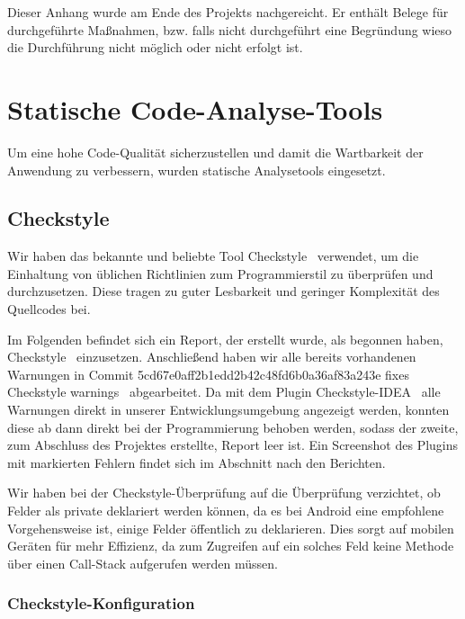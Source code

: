 
    Dieser Anhang wurde am Ende des Projekts nachgereicht. Er enthält Belege für
    durchgeführte Maßnahmen, bzw. falls nicht durchgeführt eine Begründung wieso
    die Durchführung nicht möglich oder nicht erfolgt ist. \\



\section{Statische Code-Analyse-Tools}

Um eine hohe Code-Qualität sicherzustellen und damit die Wartbarkeit der
Anwendung zu verbessern, wurden statische Analysetools eingesetzt.

\subsection{Checkstyle}

Wir haben das bekannte und beliebte Tool \glqq Checkstyle\grqq~ verwendet, um die Einhaltung von üblichen Richtlinien zum Programmierstil zu überprüfen und durchzusetzen. Diese tragen zu guter Lesbarkeit und geringer Komplexität des Quellcodes bei.

Im Folgenden befindet sich ein Report, der erstellt wurde, als begonnen haben, \glqq Checkstyle\grqq~ einzusetzen. Anschließend haben wir alle bereits vorhandenen Warnungen in Commit 5cd67e0aff2b1edd2b42c48fd6b0a36af83a243e \glqq fixes Checkstyle warnings\grqq~ abgearbeitet. Da mit dem Plugin \glqq Checkstyle-IDEA\grqq~ alle Warnungen direkt in unserer Entwicklungsumgebung angezeigt werden, konnten diese ab dann direkt bei der Programmierung behoben werden, sodass der zweite, zum Abschluss des Projektes erstellte, Report leer ist. Ein Screenshot des Plugins mit markierten Fehlern findet sich im Abschnitt nach den Berichten.

Wir haben bei der Checkstyle-Überprüfung auf die Überprüfung verzichtet, ob Felder als private deklariert werden können, da es bei Android eine empfohlene Vorgehensweise ist, einige Felder öffentlich zu deklarieren. Dies sorgt auf mobilen Geräten für mehr Effizienz, da zum Zugreifen auf ein solches Feld keine Methode über einen Call-Stack aufgerufen werden müssen.

\subsubsection{Checkstyle-Konfiguration}

